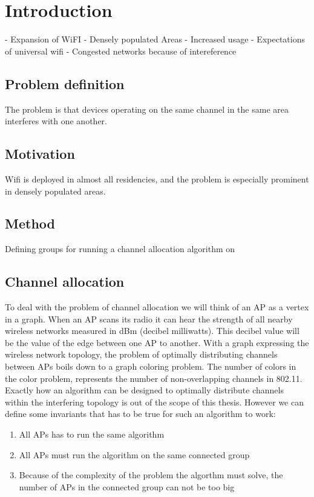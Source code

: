 \chapter{Introduction}
- Expansion of WiFI
- Densely populated Areas
- Increased usage
- Expectations of universal wifi
- Congested networks because of intereference

\section{Problem definition}
The problem is that devices operating on the same channel in the same area interferes with one another.

\section{Motivation}
Wifi is deployed in almost all residencies, and the problem is especially prominent in densely populated areas. 

\section{Method}
Defining groups for running a channel allocation algorithm on

\section{Channel allocation} 
To deal with the problem of channel allocation we will think of an AP as a vertex in a graph. When an AP scans its radio
it can hear the strength of all nearby wireless networks measured in dBm (decibel milliwatts). This decibel value will be
the value of the edge between one AP to another. With a graph expressing the wireless network topology, the problem
of optimally distributing channels between APs boils down to a graph coloring problem. The number of colors in the color problem,
   represents the number of non-overlapping channels in 802.11. Exactly how an algorithm can be designed to optimally distribute channels within the
   interfering topology is out of the scope of this thesis. However we can define some invariants that has to be true
   for such an algorithm to work:
   \begin{enumerate} 
   \item All APs has to run the same algorithm
   \item All APs must run the algorithm on the same connected group
   \item Because of the complexity of the problem the algorthm must solve, the number of APs in the connected group can not be too big
   \end{enumerate}

